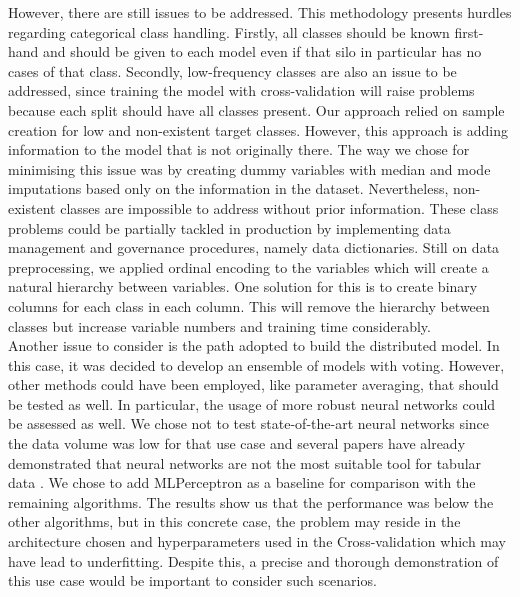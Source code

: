 However, there are still issues to be addressed. This methodology presents hurdles regarding categorical class handling. Firstly, all classes should be known first-hand and should be given to each model even if that silo in particular has no cases of that class. Secondly, low-frequency classes are also an issue to be addressed, since training the model with cross-validation will raise problems because each split should have all classes present. Our approach relied on sample creation for low and non-existent target classes. However, this approach is adding information to the model that is not originally there. The way we chose for minimising this issue was by creating dummy variables with median and mode imputations based only on the information in the dataset. Nevertheless, non-existent classes are impossible to address without prior information. These class problems could be partially tackled in production by implementing data management and governance procedures, namely data dictionaries. Still on data preprocessing, we applied ordinal encoding to the variables which will create a natural hierarchy between variables. One solution for this is to create binary columns for each class in each column. This will remove the hierarchy between classes but increase variable numbers and training time considerably.\\
Another issue to consider is the path adopted to build the distributed model. In this case, it was decided to develop an ensemble of models with voting. However, other methods could have been employed, like parameter averaging, that should be tested as well. In particular, the usage of more robust neural networks could be assessed as well. We chose not to test state-of-the-art neural networks since the data volume was low for that use case and several papers have already demonstrated that neural networks are not the most suitable tool for tabular data \cite{grinsztajnWhyTreebasedModels2022,borisovDeepNeuralNetworks2022}. We chose to add MLPerceptron as a baseline for comparison with the remaining algorithms. The results show us that the performance was below the other algorithms, but in this concrete case, the problem may reside in the architecture chosen and hyperparameters used in the Cross-validation which may have lead to underfitting. Despite this, a precise and thorough demonstration of this use case would be important to consider such scenarios. \\

